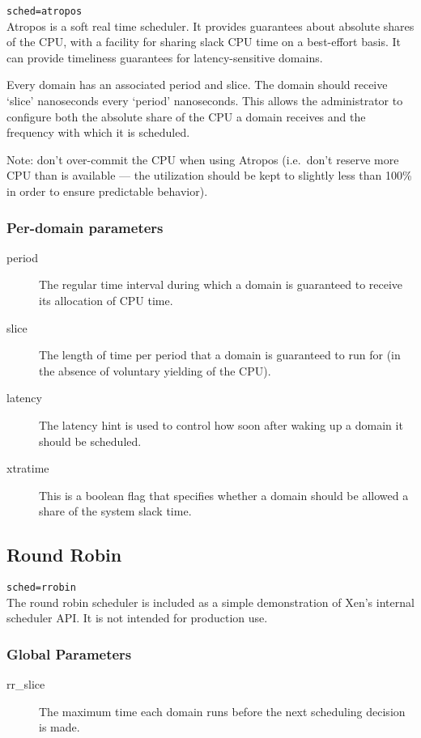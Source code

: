 {\tt sched=atropos} \\

Atropos is a soft real time scheduler.  It provides guarantees about
absolute shares of the CPU, with a facility for sharing slack CPU time
on a best-effort basis. It can provide timeliness guarantees for
latency-sensitive domains.

Every domain has an associated period and slice.  The domain should
receive `slice' nanoseconds every `period' nanoseconds.  This allows
the administrator to configure both the absolute share of the CPU a
domain receives and the frequency with which it is scheduled.


Note: don't over-commit the CPU when using Atropos (i.e.\ don't reserve
more CPU than is available --- the utilization should be kept to
slightly less than 100\% in order to ensure predictable behavior).

\subsubsection{Per-domain parameters}

\begin{description}
\item[period] The regular time interval during which a domain is
  guaranteed to receive its allocation of CPU time.
\item[slice] The length of time per period that a domain is guaranteed
  to run for (in the absence of voluntary yielding of the CPU).
\item[latency] The latency hint is used to control how soon after
  waking up a domain it should be scheduled.
\item[xtratime] This is a boolean flag that specifies whether a domain
  should be allowed a share of the system slack time.
\end{description}

\subsection{Round Robin}

{\tt sched=rrobin} \\

The round robin scheduler is included as a simple demonstration of
Xen's internal scheduler API.  It is not intended for production use.

\subsubsection{Global Parameters}

\begin{description}
\item[rr\_slice] The maximum time each domain runs before the next
  scheduling decision is made.
\end{description}

